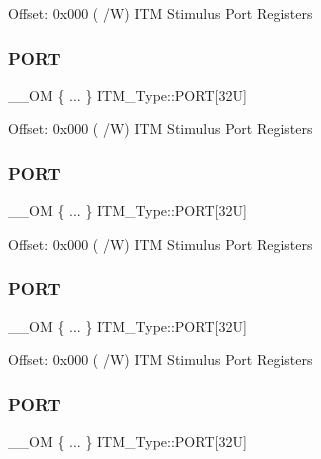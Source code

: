 Offset\+: 0x000 ( /W) I\+TM Stimulus Port Registers \mbox{\label{struct_i_t_m___type_a2fc80b848dc9408836b15f1672b69ff6}} 
\subsubsection{\texorpdfstring{PORT}{PORT}\hspace{0.1cm}{\footnotesize\ttfamily [2/6]}}
{\footnotesize\ttfamily \+\_\+\+\_\+\+OM \{ ... \}    I\+T\+M\+\_\+\+Type\+::\+P\+O\+RT\mbox{[}32\+U\mbox{]}}

Offset\+: 0x000 ( /W) I\+TM Stimulus Port Registers \mbox{\label{struct_i_t_m___type_a0a29b660072699beb29486fe5e1675a3}} 
\subsubsection{\texorpdfstring{PORT}{PORT}\hspace{0.1cm}{\footnotesize\ttfamily [3/6]}}
{\footnotesize\ttfamily \+\_\+\+\_\+\+OM \{ ... \}    I\+T\+M\+\_\+\+Type\+::\+P\+O\+RT\mbox{[}32\+U\mbox{]}}

Offset\+: 0x000 ( /W) I\+TM Stimulus Port Registers \mbox{\label{struct_i_t_m___type_a4ce174a5f5eaaa9a278eea39b42966d9}} 
\subsubsection{\texorpdfstring{PORT}{PORT}\hspace{0.1cm}{\footnotesize\ttfamily [4/6]}}
{\footnotesize\ttfamily \+\_\+\+\_\+\+OM \{ ... \}    I\+T\+M\+\_\+\+Type\+::\+P\+O\+RT\mbox{[}32\+U\mbox{]}}

Offset\+: 0x000 ( /W) I\+TM Stimulus Port Registers \mbox{\label{struct_i_t_m___type_a6ca4dbb3a8d0a64815b500481c226370}} 
\subsubsection{\texorpdfstring{PORT}{PORT}\hspace{0.1cm}{\footnotesize\ttfamily [5/6]}}
{\footnotesize\ttfamily \+\_\+\+\_\+\+OM \{ ... \}    I\+T\+M\+\_\+\+Type\+::\+P\+O\+RT\mbox{[}32\+U\mbox{]}}


